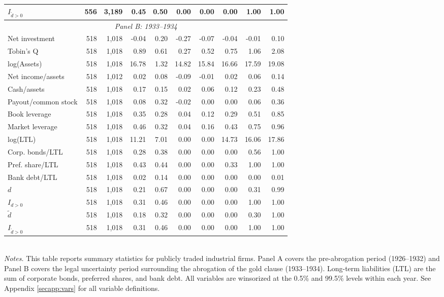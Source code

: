 \begin{table}[p]
\begin{threeparttable}
\begin{tabular}{lrrrrrrrrr}
            \ensuremath{I_{\tilde{d}>0}} & 556 & 3,189 & 0.45 & 0.50 & 0.00 & 0.00 & 0.00 & 1.00 & 1.00 \\
            \midrule
            \multicolumn{10}{c}{\textit{Panel B: 1933--1934}} \\
            \midrule
            Net investment & 518 & 1,018 & -0.04 & 0.20 & -0.27 & -0.07 & -0.04 & -0.01 & 0.10 \\
            Tobin's Q & 518 & 1,018 & 0.89 & 0.61 & 0.27 & 0.52 & 0.75 & 1.06 & 2.08 \\
            log(Assets) & 518 & 1,018 & 16.78 & 1.32 & 14.82 & 15.84 & 16.66 & 17.59 & 19.08 \\
            Net income/assets & 518 & 1,012 & 0.02 & 0.08 & -0.09 & -0.01 & 0.02 & 0.06 & 0.14 \\
            Cash/assets & 518 & 1,018 & 0.17 & 0.15 & 0.02 & 0.06 & 0.12 & 0.23 & 0.48 \\
            Payout/common stock & 518 & 1,018 & 0.08 & 0.32 & -0.02 & 0.00 & 0.00 & 0.06 & 0.36 \\
            Book leverage & 518 & 1,018 & 0.35 & 0.28 & 0.04 & 0.12 & 0.29 & 0.51 & 0.85 \\
            Market leverage & 518 & 1,018 & 0.46 & 0.32 & 0.04 & 0.16 & 0.43 & 0.75 & 0.96 \\
            log(LTL) & 518 & 1,018 & 11.21 & 7.01 & 0.00 & 0.00 & 14.73 & 16.06 & 17.86 \\
            Corp. bonds/LTL & 518 & 1,018 & 0.28 & 0.38 & 0.00 & 0.00 & 0.00 & 0.56 & 1.00 \\
            Pref. share/LTL & 518 & 1,018 & 0.43 & 0.44 & 0.00 & 0.00 & 0.33 & 1.00 & 1.00 \\
            Bank debt/LTL & 518 & 1,018 & 0.02 & 0.14 & 0.00 & 0.00 & 0.00 & 0.00 & 0.01 \\
            \ensuremath{d} & 518 & 1,018 & 0.21 & 0.67 & 0.00 & 0.00 & 0.00 & 0.31 & 0.99 \\
            \ensuremath{I_{d>0}} & 518 & 1,018 & 0.31 & 0.46 & 0.00 & 0.00 & 0.00 & 1.00 & 1.00 \\
            \ensuremath{\tilde{d}} & 518 & 1,018 & 0.18 & 0.32 & 0.00 & 0.00 & 0.00 & 0.30 & 1.00 \\
            \ensuremath{I_{\tilde{d}>0}} & 518 & 1,018 & 0.31 & 0.46 & 0.00 & 0.00 & 0.00 & 1.00 & 1.00 \\
            \bottomrule
        \end{tabular}
    \end{threeparttable}\\
    
    \vspace*{3mm} \justifying \noindent
    \scriptsize{\textit{Notes.} This table reports summary statistics for publicly traded industrial firms. Panel A covers the pre-abrogation period (1926--1932) and Panel B covers the legal uncertainty period surrounding the abrogation of the gold clause (1933--1934). Long-term liabilities (LTL) are the sum of corporate bonds, preferred shares, and bank debt. All variables are winsorized at the 0.5\% and 99.5\% levels within each year. See Appendix \ref{secapp:vars} for all variable definitions.}
\end{table}